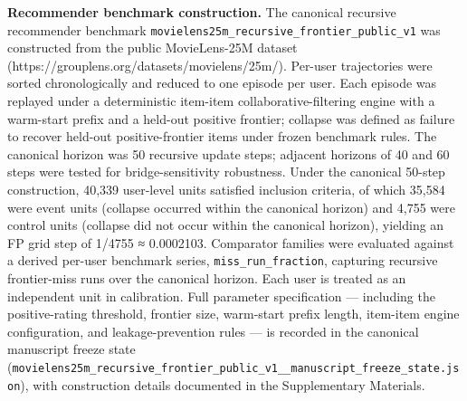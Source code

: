 \documentclass[
  11pt,
]{article}
\begin{document}
\textbf{Recommender benchmark construction.} The canonical recursive
recommender benchmark
\texttt{movielens25m\_recursive\_frontier\_public\_v1} was constructed
from the public MovieLens-25M dataset
(https://grouplens.org/datasets/movielens/25m/). Per-user trajectories
were sorted chronologically and reduced to one episode per user. Each
episode was replayed under a deterministic item-item
collaborative-filtering engine with a warm-start prefix and a held-out
positive frontier; collapse was defined as failure to recover held-out
positive-frontier items under frozen benchmark rules. The canonical
horizon was 50 recursive update steps; adjacent horizons of 40 and 60
steps were tested for bridge-sensitivity robustness. Under the canonical
50-step construction, 40,339 user-level units satisfied inclusion
criteria, of which 35,584 were event units (collapse occurred within the
canonical horizon) and 4,755 were control units (collapse did not occur
within the canonical horizon), yielding an FP grid step of 1/4755 ≈
0.0002103. Comparator families were evaluated against a derived per-user
benchmark series, \texttt{miss\_run\_fraction}, capturing recursive
frontier-miss runs over the canonical horizon. Each user is treated as
an independent unit in calibration. Full parameter specification ---
including the positive-rating threshold, frontier size, warm-start
prefix length, item-item engine configuration, and leakage-prevention
rules --- is recorded in the canonical manuscript freeze state
(\texttt{movielens25m\_recursive\_frontier\_public\_v1\_\_manuscript\_freeze\_state.json}),
with construction details documented in the Supplementary Materials.
\end{document}
